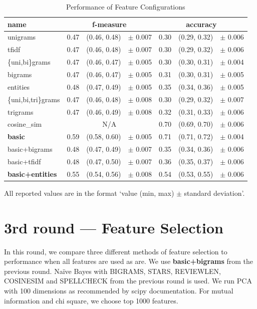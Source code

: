 \begin{table}[h!]

\centering
\begin{tabular}{lr@{~}r@{~}rr@{~}r@{~}r}
\toprule
\textbf{name}	& \multicolumn{3}{c}{\textbf{f-measure}} & \multicolumn{3}{c}{\textbf{accuracy}} \\
\midrule
unigrams& 0.47 & (0.46, 0.48) & $\pm$ 0.007 & 0.30 & (0.29, 0.32) & $\pm$ 0.006 \\
tfidf& 0.47 & (0.46, 0.48) & $\pm$ 0.007 & 0.30 & (0.29, 0.32) & $\pm$ 0.006 \\
\{uni,bi\}grams	& 0.47 & (0.46, 0.47) & $\pm$ 0.005 & 0.30 & (0.30, 0.31) & $\pm$ 0.004\\
bigrams & 0.47 & (0.46, 0.47) & $\pm$ 0.005 & 0.31 & (0.30, 0.31) & $\pm$ 0.005			\\
entities & 0.48 & (0.47, 0.49) & $\pm$ 0.005 & 0.35 & (0.34, 0.36) & $\pm$ 0.005		\\
\{uni,bi,tri\}grams & 0.47 & (0.46, 0.48) & $\pm$ 0.008 & 0.30 & (0.29, 0.32) & $\pm$ 0.007	\\
trigrams & 0.47 & (0.46, 0.49) & $\pm$ 0.008 & 0.32 & (0.31, 0.33) & $\pm$ 0.006		\\
cosine\_sim & \multicolumn{3}{c}{N/A} & 0.70 & (0.69, 0.70) & $\pm$ 0.006		\\
\textbf{basic} & 0.59 & (0.58, 0.60) & $\pm$ 0.005 & 0.71 & (0.71, 0.72) & $\pm$ 0.004		\\
basic+bigrams & 0.48 & (0.47, 0.49) & $\pm$ 0.007 & 0.35 & (0.34, 0.36) & $\pm$ 0.006		\\
basic+tfidf & 0.48 & (0.47, 0.50) & $\pm$ 0.007 & 0.36 & (0.35, 0.37) & $\pm$ 0.006			\\
\textbf{basic+entities} & 0.55 & (0.54, 0.56) & $\pm$ 0.008 & 0.54 & (0.53, 0.55) & $\pm$ 0.006		\\
\bottomrule
\end{tabular}






\caption{Performance of Feature Configurations}\label{tab:feat_perf}
All reported values are in the format `value (min, max) $\pm$ standard deviation'.
\end{table}


\section{3rd round --- Feature Selection}

In this round, we compare three different methods of feature selection to performance when all features are used as are.
We use \textbf{basic+bigrams} from the previous round.
Na\"{i}ve Bayes with BIGRAMS, STARS, REVIEWLEN, COSINESIM and SPELLCHECK from the previous round is used.
We run PCA with 100 dimensions as recommended by scipy documentation.
For mutual information and chi square, we choose top 1000 features.

